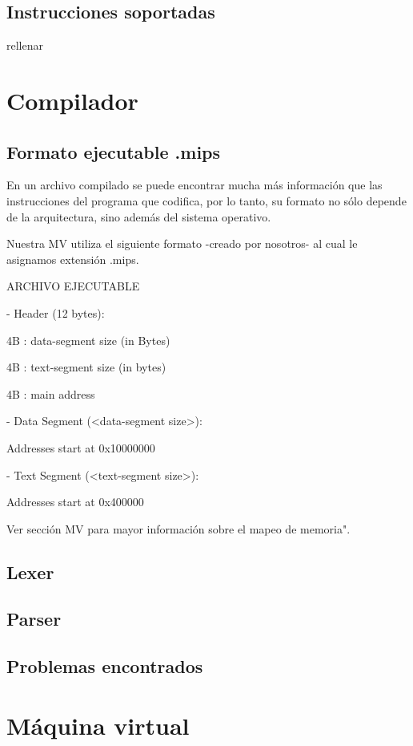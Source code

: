 \documentclass[12pt]{article}
\begin{document}
\subsection{Instrucciones soportadas}
rellenar
    
\section{Compilador}
\subsection{Formato ejecutable .mips}

En un archivo compilado se puede encontrar mucha más información que las instrucciones del programa que codifica, por lo tanto, su formato no sólo depende de la arquitectura, sino además del sistema operativo.

Nuestra MV utiliza el siguiente formato -creado por nosotros- al cual le asignamos extensión .mips.


ARCHIVO EJECUTABLE

- Header (12 bytes):

    4B : data-segment size (in Bytes)

    4B : text-segment size (in bytes)

    4B : main address

- Data Segment (<data-segment size>):

    Addresses start at 0x10000000

- Text Segment (<text-segment size>):

    Addresses start at 0x400000

Ver sección MV para mayor información sobre el mapeo de memoria".

\subsection{Lexer}
\subsection{Parser}
\subsection{Problemas encontrados}
    
   
\section{Máquina virtual}
\end{document}
